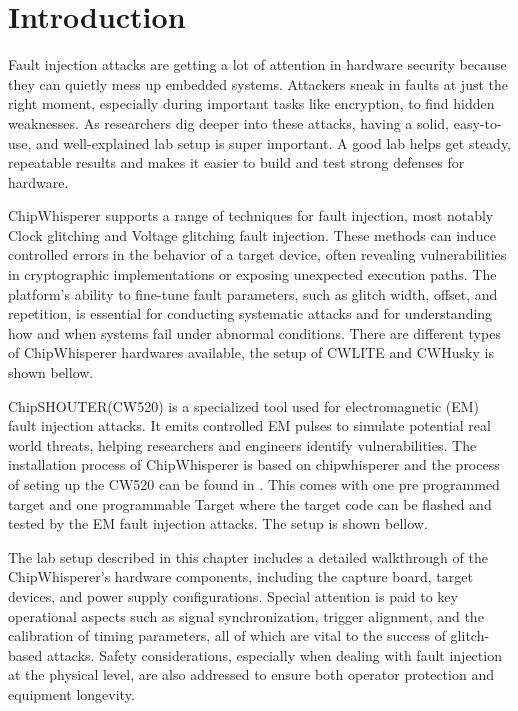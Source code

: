  \section{Introduction}
 Fault injection attacks are getting a lot of attention in hardware security because they can quietly mess up embedded systems. Attackers sneak in faults at just the right moment, especially during important tasks like encryption, to find hidden weaknesses. As researchers dig deeper into these attacks, having a solid, easy-to-use, and well-explained lab setup is super important. A good lab helps get steady, repeatable results and makes it easier to build and test strong defenses for hardware.
 
 ChipWhisperer \cite{chipwhisperer2025} supports a range of techniques for fault injection, most notably Clock glitching and Voltage glitching fault injection. These methods can induce controlled errors in the behavior of a target device, often revealing vulnerabilities in cryptographic implementations or exposing unexpected execution paths. The platform’s ability to fine-tune fault parameters, such as glitch width, offset, and repetition, is essential for conducting systematic attacks and for understanding how and when systems fail under abnormal conditions. There are different types of ChipWhisperer hardwares available, the setup of CWLITE and CWHusky is shown bellow.

 ChipSHOUTER(CW520) \cite{chipshouter_doc} is a specialized tool used for electromagnetic (EM) fault injection attacks. It emits controlled EM pulses to simulate potential real world threats, helping researchers and engineers identify vulnerabilities. The installation process of ChipWhisperer is based on chipwhisperer and the process of seting up the CW520 can be found in \cite{chipshouter_manual_v1.4}. This comes with one pre programmed target and one programmable Target \cite{chipshouter_ballistic_gel} where the target code can be flashed and tested by the EM fault injection attacks. The setup is shown bellow.

 
 The lab setup described in this chapter includes a detailed walkthrough of the ChipWhisperer’s hardware components, including the capture board, target devices, and power supply configurations. Special attention is paid to key operational aspects such as signal synchronization, trigger alignment, and the calibration of timing parameters, all of which are vital to the success of glitch-based attacks. Safety considerations, especially when dealing with fault injection at the physical level, are also addressed to ensure both operator protection and equipment longevity.
 
